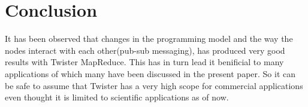 \documentclass[9pt,twocolumn,twoside]{styles/osajnl}
\begin{document}
\section{Conclusion}
It has been observed that changes in the programming model and the way
the nodes interact with each other(pub-sub
messaging)\cite{ekanayake2010twister}, has produced very good results
with Twister MapReduce. This has in turn lead it benificial to many
applications of which many have been discussed in the present
paper. So it can be safe to assume that Twister has a very high scope
for commercial applications even thought it is limited to scientific
applications as of now.


 
\end{document}
